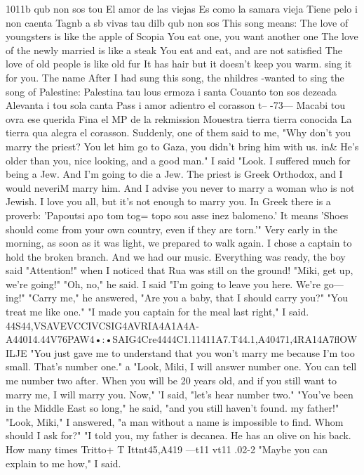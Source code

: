 1011b qub non sos tou 
El amor de las viejas 
Es como la samara vieja 
Tiene pelo i non caenta 
Tagnb a sb vivas tau 
dilb qub non sos 
This song means: 
The love of youngsters is like the apple of Scopia 
You eat one, you want another one 
The love of the newly married is like a steak 
You eat and eat, and are not satisfied 
The love of old people is like old fur 
It has hair but it doesn't keep you warm.
sing it for you.
The name 
After I had sung this song, the nhildres -wanted to sing the song of Palestine: 
Palestina tau lous ermoza i santa 
Couanto ton sos dezeada 
Alevanta i tou sola canta 
Pass i amor 
adientro el 
corasson 
t--
-73— 
Macabi tou ovra ese querida 
Fina el MP de la rekmission 
Mouestra tierra tierra conocida 
La tierra qua alegra el corasson.
Suddenly, one of them said to me, "Why don't you marry the priest?
You let him go 
to Gaza, you didn't bring him with us.
in& He's older than you, nice looking, and a 
good man."
I said "Look.
I suffered much for being a Jew.
And I'm going to die a Jew.
The priest is Greek Orthodox, and I would neveriM marry him.
And I advise you never to 
marry a woman who is not Jewish.
I love you all, but it's not enough to marry you.
In 
Greek there is a proverb: 'Papoutsi apo tom tog= topo sou asse inez balomeno.'
It means 
'Shoes should come from your own country, even if they are torn.'"
Very early in the morning, as soon as it was light, we prepared to walk again.
I 
chose a captain to hold the broken branch.
And we had our music.
Everything was ready, 
the boy said "Attention!"
when I noticed that Rua was still on the ground!
"Miki, get 
up, we're going!"
"Oh, no," he said.
I said "I'm going to leave you here.
We're go— 
ing!"
"Carry me," he answered, 
"Are you a baby, that I should carry you?"
"You treat me like one."
"I made you captain for the meal last right," I said.
44S44,VSAVEVCCIVCSIG4AVRIA4A1A4A-A44014.44V76PAW4•:•SAIG4Cre4444C1.11411A7.T44.1,A40471,4RA14A7flOWILJE 
"You just gave me to understand that you won't marry me because I'm too small.
That's number one."
a 
"Look, Miki, I will answer number one.
You can tell me number two after.
When 
you will be 20 years old, and if you still want to marry me, I will marry you.
Now," 
'I said, "let's hear number two."
"You've been in the Middle East so long," he said, "and you still haven't found.
my father!"
"Look, Miki," I answered, "a man without a name is impossible to find.
Whom should 
I ask for?"
"I told you, my father is decanea.
He has an olive on his back.
How many times 
Tritto+ T Ittnt45,A419 ---t11 vt11 .02-2 
"Maybe you can explain to me how," I said.
